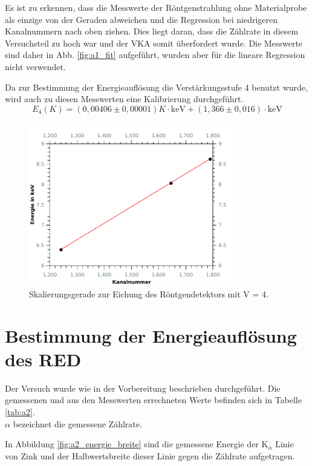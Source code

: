 Es ist zu erkennen, dass die Messwerte der Röntgenstrahlung ohne Materialprobe als einzige von der Geraden abweichen und die Regression bei niedrigeren Kanalnummern nach oben ziehen. Dies liegt daran, dass die Zählrate in diesem Versuchsteil zu hoch war und der VKA somit überfordert wurde. Die Messwerte sind daher in Abb. \ref{fig:a1_fit} aufgeführt, wurden aber für die lineare Regression nicht verwendet.

Da zur Bestimmung der Energieauflösung die Verstärkungsstufe 4 benutzt wurde, wird auch zu diesen Messwerten eine Kalibrierung durchgeführt.
\begin{equation}
	E_4(K) = (0,00406\pm 0,00001)K\cdot\si{\kilo\electronvolt} + (1,366\pm 0,016)\cdot\si{\kilo\electronvolt}
\end{equation} 

\begin{figure}[h]
	\centering\includegraphics[width=0.8\textwidth]{fig/a1_fit_4}
	\caption{Skalierungsgerade zur Eichung des Röntgendetektors mit V = 4.}
	\label{fig:a1_fit_4}
\end{figure}

\section{Bestimmung der Energieauflösung des RED}
Der Versuch wurde wie in der Vorbereitung beschrieben durchgeführt.
Die gemessenen und aus den Messwerten errechneten Werte befinden sich in Tabelle \ref{tab:a2}.\\
$\alpha$ bezeichnet die gemessene Zählrate.


In Abbildung \ref{fig:a2_energie_breite} sind die gemessene Energie der K$_\alpha$ Linie von Zink und der Halbwertsbreite dieser Linie gegen die Zählrate aufgetragen.


